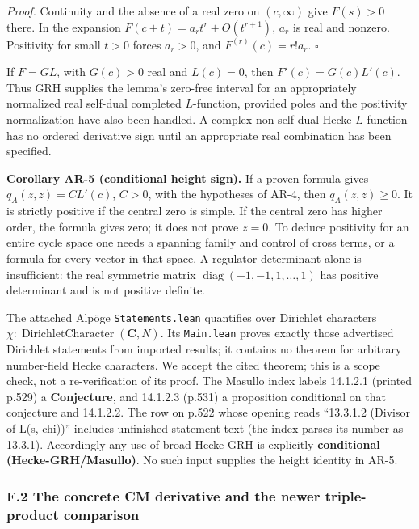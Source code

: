 \documentclass[11pt,a4paper]{article}
\begin{document}
\emph{Proof.} Continuity and the absence of a real zero on
\((c,\infty)\) give \(F(s)>0\) there. In the expansion
\(F(c+t)=a_rt^r+O(t^{r+1})\), \(a_r\) is real and nonzero. Positivity
for small \(t>0\) forces \(a_r>0\), and \(F^{(r)}(c)=r!a_r\).
\(\square\)

If \(F=G L\), with \(G(c)>0\) real and \(L(c)=0\), then
\(F'(c)=G(c)L'(c)\). Thus GRH supplies the lemma's zero-free interval
for an appropriately normalized real self-dual completed \(L\)-function,
provided poles and the positivity normalization have also been handled.
A complex non-self-dual Hecke \(L\)-function has no ordered derivative
sign until an appropriate real combination has been specified.

\textbf{Corollary AR-5 (conditional height sign).} If a proven formula
gives \(q_A(z,z)=C L'(c)\), \(C>0\), with the hypotheses of AR-4, then
\(q_A(z,z)\ge0\). It is strictly positive if the central zero is simple.
If the central zero has higher order, the formula gives zero; it does
not prove \(z=0\). To deduce positivity for an entire cycle space one
needs a spanning family and control of cross terms, or a formula for
every vector in that space. A regulator determinant alone is
insufficient: the real symmetric matrix
\(\operatorname{diag}(-1,-1,1,\ldots,1)\) has positive determinant and
is not positive definite.

The attached Alpöge \texttt{Statements.lean} quantifies over Dirichlet
characters \(\chi:\operatorname{DirichletCharacter}(\mathbf C,N)\). Its
\texttt{Main.lean} proves exactly those advertised Dirichlet statements
from imported results; it contains no theorem for arbitrary number-field
Hecke characters. We accept the cited theorem; this is a scope check,
not a re-verification of its proof. The Masullo index labels 14.1.2.1
(printed p.529) a \textbf{Conjecture}, and 14.1.2.3 (p.531) a
proposition conditional on that conjecture and 14.1.2.2. The row on
p.522 whose opening reads ``13.3.1.2 (Divisor of L(s, chi))'' includes
unfinished statement text (the index parses its number as 13.3.1).
Accordingly any use of broad Hecke GRH is explicitly \textbf{conditional
(Hecke-GRH/Masullo)}. No such input supplies the height identity in
AR-5.

\subsubsection{F.2 The concrete CM derivative and the newer
triple-product
comparison}\label{f.2-the-concrete-cm-derivative-and-the-newer-triple-product-comparison}
\end{document}
